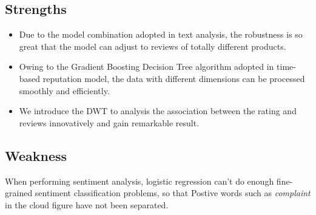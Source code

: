 \documentclass[12pt]{article}%
\begin{document}
\subsection{Strengths}
\begin{itemize}
	\item  Due to the model combination adopted in text analysis, the robustness is so great that the model can adjust to reviews of totally different products. 
	\item  Owing to the Gradient Boosting Decision Tree algorithm adopted in time-based reputation model, the data with different dimensions can be processed smoothly and efficiently.
	\item We introduce the DWT to analysis the association between the rating and reviews innovatively and gain remarkable result.
\end{itemize}

\subsection{Weakness}
		When performing sentiment analysis, logistic regression can't do enough fine-grained sentiment classification problems, so that Postive words such as \textit{complaint} in the cloud figure have not been separated.
		

\end{document}
